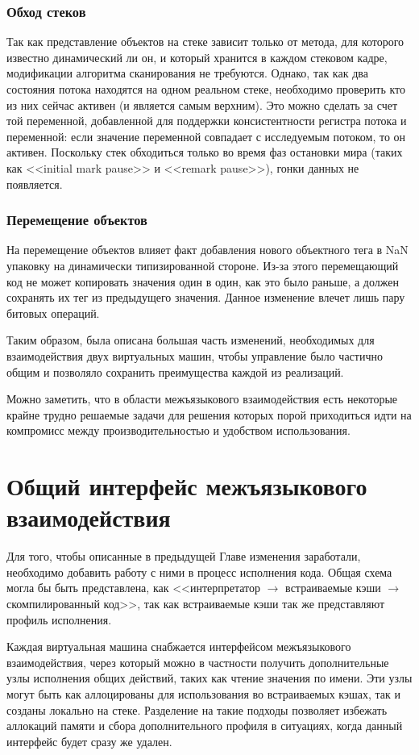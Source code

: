 \documentclass[times
]{itmo-student-thesis}
\begin{document}
\subsection{Обход стеков}
Так как представление объектов на стеке зависит только от метода, для которого известно динамический ли он, и который хранится в каждом стековом кадре, модификации алгоритма сканирования не требуются. Однако, так как два состояния потока находятся на одном реальном стеке, необходимо проверить кто из них сейчас активен (и является самым верхним). Это можно сделать за счет той переменной, добавленной для поддержки консистентности регистра потока и переменной: если значение переменной совпадает с исследуемым потоком, то он активен. Поскольку стек обходиться только во время фаз остановки мира (таких как <<initial mark pause>> и <<remark pause>>), гонки данных не появляется.
\subsection{Перемещение объектов}
На перемещение объектов влияет факт добавления нового объектного тега в NaN упаковку на динамически типизированной стороне. Из-за этого перемещающий код не может копировать значения один в один, как это было раньше, а должен сохранять их тег из предыдущего значения. Данное изменение влечет лишь пару битовых операций.


\chapterconclusion
Таким образом, была описана большая часть изменений, необходимых для взаимодействия двух виртуальных машин, чтобы управление было частично общим и позволяло сохранить преимущества каждой из реализаций.

Можно заметить, что в области межъязыкового взаимодействия есть некоторые крайне трудно решаемые задачи для решения которых порой приходиться идти на компромисс между производительностью и удобством использования.

\chapter{Общий интерфейс межъязыкового взаимодействия}\label{ch:architecture}
Для того, чтобы описанные в предыдущей Главе изменения заработали, необходимо добавить работу с ними в процесс исполнения кода. Общая схема могла бы быть представлена, как <<интерпретатор $\rightarrow$ встраиваемые кэши $\rightarrow$ скомпилированный код>>, так как встраиваемые кэши так же представляют профиль исполнения.

Каждая виртуальная машина снабжается интерфейсом межъязыкового взаимодействия, через который можно в частности получить дополнительные узлы исполнения общих действий, таких как чтение значения по имени. Эти узлы могут быть как аллоцированы для использования во встраиваемых кэшах, так и созданы локально на стеке. Разделение на такие подходы позволяет избежать аллокаций памяти и сбора дополнительного профиля в ситуациях, когда данный интерфейс будет сразу же удален.
\end{document}
